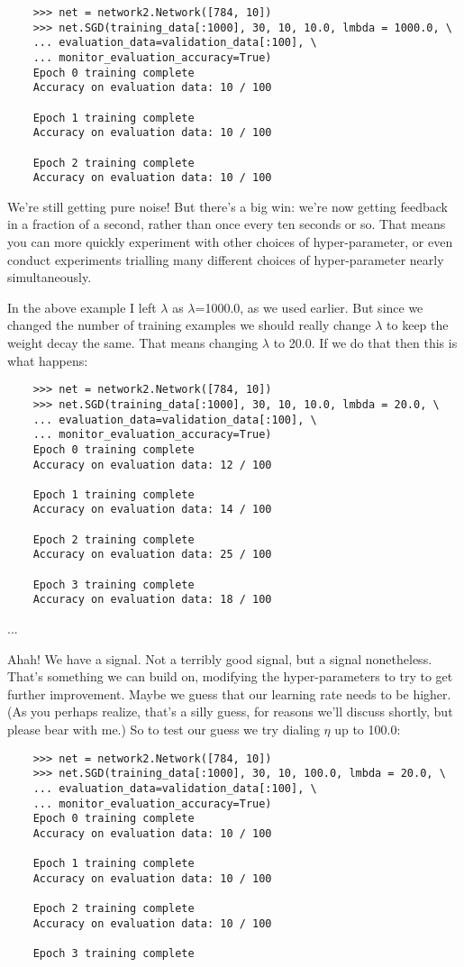 \begin{lstlisting}
    >>> net = network2.Network([784, 10])
    >>> net.SGD(training_data[:1000], 30, 10, 10.0, lmbda = 1000.0, \
    ... evaluation_data=validation_data[:100], \
    ... monitor_evaluation_accuracy=True)
    Epoch 0 training complete
    Accuracy on evaluation data: 10 / 100
    
    Epoch 1 training complete
    Accuracy on evaluation data: 10 / 100
    
    Epoch 2 training complete
    Accuracy on evaluation data: 10 / 100
\end{lstlisting}

We're still getting pure noise! But there's a big win: we're now getting feedback in a fraction of a second, rather than once every ten seconds or so. That means you can more quickly experiment with other choices of hyper-parameter, or even conduct experiments trialling many different choices of hyper-parameter nearly simultaneously.

In the above example I left $\lambda$ as $\lambda$=1000.0, as we used earlier. But since we changed the number of training examples we should really change $\lambda$ to keep the weight decay the same. That means changing $\lambda$ to 20.0. If we do that then this is what happens:

\begin{lstlisting}
    >>> net = network2.Network([784, 10])
    >>> net.SGD(training_data[:1000], 30, 10, 10.0, lmbda = 20.0, \
    ... evaluation_data=validation_data[:100], \
    ... monitor_evaluation_accuracy=True)
    Epoch 0 training complete
    Accuracy on evaluation data: 12 / 100
    
    Epoch 1 training complete
    Accuracy on evaluation data: 14 / 100
    
    Epoch 2 training complete
    Accuracy on evaluation data: 25 / 100
    
    Epoch 3 training complete
    Accuracy on evaluation data: 18 / 100
\end{lstlisting}...

Ahah! We have a signal. Not a terribly good signal, but a signal nonetheless. That's something we can build on, modifying the hyper-parameters to try to get further improvement. Maybe we guess that our learning rate needs to be higher. (As you perhaps realize, that's a silly guess, for reasons we'll discuss shortly, but please bear with me.) So to test our guess we try dialing $\eta$ up to 100.0:

\begin{lstlisting}
    >>> net = network2.Network([784, 10])
    >>> net.SGD(training_data[:1000], 30, 10, 100.0, lmbda = 20.0, \
    ... evaluation_data=validation_data[:100], \
    ... monitor_evaluation_accuracy=True)
    Epoch 0 training complete
    Accuracy on evaluation data: 10 / 100
    
    Epoch 1 training complete
    Accuracy on evaluation data: 10 / 100
    
    Epoch 2 training complete
    Accuracy on evaluation data: 10 / 100
    
    Epoch 3 training complete
\end{lstlisting}


